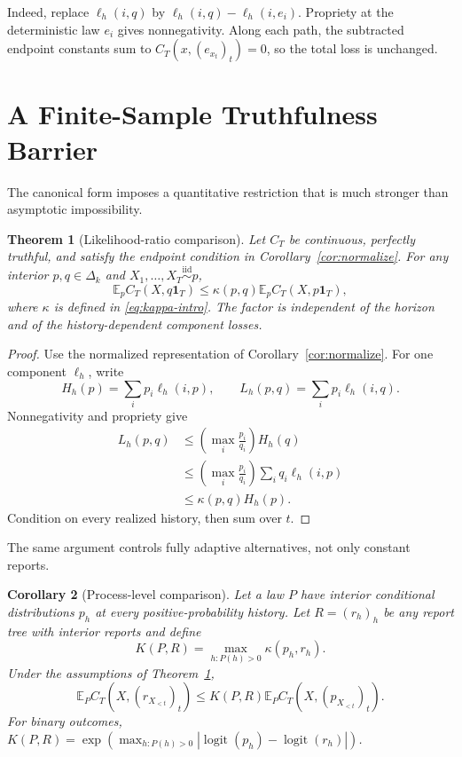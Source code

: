 \documentclass[twoside]{article}
\newtheorem{theorem}{Theorem}
\newtheorem{corollary}[theorem]{Corollary}
\newcommand{\E}{\mathbb E}
\newcommand{\1}{\mathbf 1}
\begin{document}
Indeed, replace $\ell_h(i,q)$ by $\ell_h(i,q)-\ell_h(i,e_i)$. Propriety at the deterministic law $e_i$ gives nonnegativity. Along each path, the subtracted endpoint constants sum to $C_T(x,(e_{x_t})_t)=0$, so the total loss is unchanged.

\section{A Finite-Sample Truthfulness Barrier}
\label{sec:barrier}

The canonical form imposes a quantitative restriction that is much stronger than asymptotic impossibility.

\begin{theorem}[Likelihood-ratio comparison]
\label{thm:ratio}
Let $C_T$ be continuous, perfectly truthful, and satisfy the endpoint condition in Corollary~\ref{cor:normalize}. For any interior $p,q\in\Delta_k$ and $X_1,\ldots,X_T\stackrel{\mathrm{iid}}\sim p$,
\begin{equation}
 \E_p C_T(X,q\1_T)
 \leq \kappa(p,q)\E_p C_T(X,p\1_T),
 \label{eq:ratio}
\end{equation}
where $\kappa$ is defined in \eqref{eq:kappa-intro}. The factor is independent of the horizon and of the history-dependent component losses.
\end{theorem}

\begin{proof}
Use the normalized representation of Corollary~\ref{cor:normalize}. For one component $\ell_h$, write
\begin{equation*}
 H_h(p)=\sum_i p_i\ell_h(i,p),\qquad
 L_h(p,q)=\sum_i p_i\ell_h(i,q).
\end{equation*}
Nonnegativity and propriety give
\begin{align*}
 L_h(p,q)
 &\leq \left(\max_i\frac{p_i}{q_i}\right)H_h(q)\\
 &\leq \left(\max_i\frac{p_i}{q_i}\right)
       \sum_i q_i\ell_h(i,p)\\
 &\leq \kappa(p,q)H_h(p).
\end{align*}
Condition on every realized history, then sum over $t$.
\end{proof}

The same argument controls fully adaptive alternatives, not only constant reports.

\begin{corollary}[Process-level comparison]
\label{cor:process}
Let a law $P$ have interior conditional distributions $p_h$ at every positive-probability history. Let $R=(r_h)_h$ be any report tree with interior reports and define
\begin{equation*}
 K(P,R)=\max_{h:P(h)>0}\kappa(p_h,r_h).
\end{equation*}
Under the assumptions of Theorem~\ref{thm:ratio},
\begin{equation}
 \E_P C_T(X,(r_{X_{<t}})_t)
 \leq K(P,R)\E_P C_T(X,(p_{X_{<t}})_t).
 \label{eq:process-ratio}
\end{equation}
For binary outcomes, $K(P,R)=\exp(\max_{h:P(h)>0}|\operatorname{logit}(p_h)- \operatorname{logit}(r_h)|)$.
\end{corollary}
\end{document}
